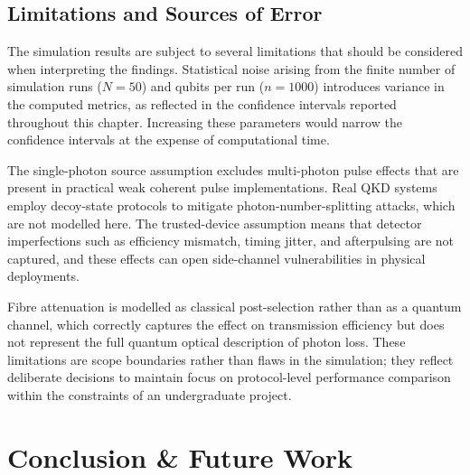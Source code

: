 


\section{Limitations and Sources of Error}

The simulation results are subject to several limitations that should be considered when interpreting the findings. Statistical noise arising from the finite number of simulation runs ($N = 50$) and qubits per run ($n = 1000$) introduces variance in the computed metrics, as reflected in the confidence intervals reported throughout this chapter. Increasing these parameters would narrow the confidence intervals at the expense of computational time.

The single-photon source assumption excludes multi-photon pulse effects that are present in practical weak coherent pulse implementations. Real QKD systems employ decoy-state protocols to mitigate photon-number-splitting attacks, which are not modelled here. The trusted-device assumption means that detector imperfections such as efficiency mismatch, timing jitter, and afterpulsing are not captured, and these effects can open side-channel vulnerabilities in physical deployments.

Fibre attenuation is modelled as classical post-selection rather than as a quantum channel, which correctly captures the effect on transmission efficiency but does not represent the full quantum optical description of photon loss. These limitations are scope boundaries rather than flaws in the simulation; they reflect deliberate decisions to maintain focus on protocol-level performance comparison within the constraints of an undergraduate project.


%
%

\chapter{Conclusion \& Future Work}

